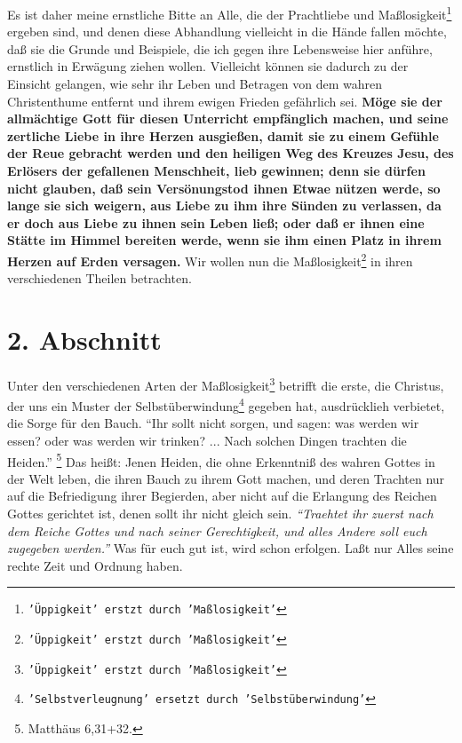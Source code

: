 Es ist daher meine
ernstliche Bitte an Alle, die der Prachtliebe und Maßlosigkeit\footnote{\texttt{'Üppigkeit' erstzt durch 'Maßlosigkeit'}} ergeben sind, und
denen diese Abhandlung vielleicht in die Hände fallen möchte, daß sie die Grunde
und Beispiele, die ich gegen ihre Lebensweise hier anführe, ernstlich in
Erwägung ziehen wollen. Vielleicht können sie dadurch zu der Einsicht gelangen,
wie sehr ihr Leben und Betragen von dem wahren Christenthume entfernt und ihrem
ewigen Frieden gefährlich sei. \label{ref:14_01_wahre_nachfolger_suenetod}
\textbf{Möge sie der allmächtige Gott für diesen
Unterricht empfänglich machen, und seine zertliche Liebe in ihre Herzen
ausgießen, damit sie zu einem Gefühle der Reue gebracht werden und den heiligen
Weg des Kreuzes Jesu, des Erlösers der gefallenen Menschheit, lieb gewinnen;
denn sie dürfen nicht glauben, daß sein Versönungstod ihnen Etwae nützen werde,
so lange sie sich weigern, aus Liebe zu ihm ihre Sünden zu verlassen, da er doch
aus Liebe zu ihnen sein Leben ließ; oder daß er ihnen eine Stätte im Himmel
bereiten werde, wenn sie ihm einen Platz in ihrem Herzen auf Erden versagen.} Wir
wollen nun die Maßlosigkeit\footnote{\texttt{'Üppigkeit' erstzt durch 'Maßlosigkeit'}} in ihren verschiedenen Theilen betrachten.

\section{2. Abschnitt} \label{kap14_ab2}

Unter den verschiedenen Arten der Maßlosigkeit\footnote{\texttt{'Üppigkeit' erstzt durch 'Maßlosigkeit'}} betrifft die erste, die Christus,
der uns ein Muster der Selbstüberwindung\footnote{\texttt{'Selbstverleugnung' ersetzt durch 'Selbstüberwindung'}} gegeben hat, ausdrücklieh verbietet,
die Sorge für den Bauch.
"`Ihr sollt nicht sorgen, und sagen: was werden wir
essen? oder was werden wir trinken? ... Nach solchen Dingen trachten die
Heiden."'
\footnote{Matthäus 6,31+32.}
Das heißt: Jenen Heiden, die ohne
Erkenntniß des wahren Gottes in der Welt leben, die ihren Bauch zu ihrem Gott
machen, und deren Trachten nur auf die Befriedigung ihrer Begierden, aber nicht
auf die Erlangung des Reichen Gottes gerichtet ist, denen sollt ihr nicht gleich
sein.
\textit{"`Traehtet ihr zuerst nach dem Reiche Gottes und nach seiner
Gerechtigkeit, und alles Andere soll euch zugegeben werden."'} Was für euch gut
ist, wird schon erfolgen. Laßt nur Alles seine rechte Zeit und Ordnung haben.

